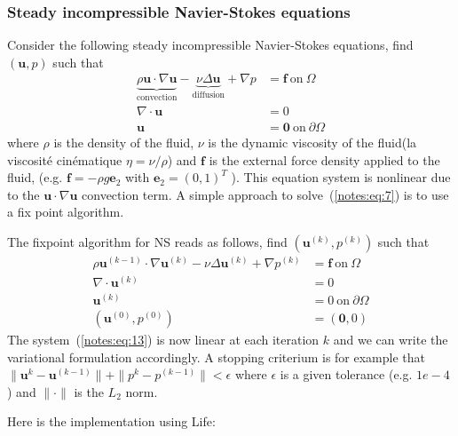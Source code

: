 \subsubsection{Steady incompressible Navier-Stokes equations}
  Consider the following steady incompressible Navier-Stokes
  equations, find $(\mathbf{u},p)$ such that
  \begin{equation}
    \label{notes:eq:7}
    \begin{split}
      \underbrace{\rho \mathbf{u} \cdot \nabla \mathbf{u}}_{\text{convection}} - \underbrace{\nu \Delta  \mathbf{u}}_{\text{diffusion}} + \nabla p &=  \mathbf{f} \ \text{on}\ \Omega \\
      \nabla \cdot \mathbf{u} &= 0 \\
      \mathbf{u} &= \mathbf{0}\ \text{on}\ \partial \Omega
    \end{split}
  \end{equation}
  where $\rho$ is the density of the fluid, $\nu$ is the dynamic
  viscosity of the fluid(la viscosité cinématique $\eta = \nu/\rho$) and $\mathbf{f}$ is the external force
  density applied to the fluid, (e.g. $\mathbf{f}=-\rho g \mathbf{e}_2$ with $\mathbf{e}_2=(0,1)^T$ ).  This equation system is nonlinear due
  to the $\mathbf{u} \cdot \nabla \mathbf{u}$ convection term. A
  simple approach to solve~(\ref{notes:eq:7}) is to use a fix point
  algorithm.


The fixpoint algorithm for NS reads as follows, find
$(\mathbf{u}^{(k)},p^{(k)})$ such that
    \begin{equation}
      \label{notes:eq:13}
    \begin{split}
      \rho\mathbf{u}^{(k-1)} \cdot \nabla \mathbf{u}^{(k)} - \nu \Delta  \mathbf{u}^{(k)} + \nabla p^{(k)} &= \mathbf{f} \ \text{on}\ \Omega \\
      \nabla \cdot \mathbf{u}^{(k)} &= 0 \\
      \mathbf{u}^{(k)} &= 0\ \text{on}\ \partial \Omega\\
      (\mathbf{u}^{(0)},p^{(0)}) &= (\mathbf{0},0)
    \end{split}
  \end{equation}
  The system~(\ref{notes:eq:13}) is now linear at each iteration $k$ and we
  can write the variational formulation accordingly. A stopping
  criterium is for example that
  $\|\mathbf{u}^{k}-\mathbf{u}^{(k-1)}\|+\|p^{k}-p^{(k-1)}\| <
  \epsilon$ where $\epsilon$ is a given tolerance (e.g. $1e-4$) and
  $\|\cdot\|$ is the $L_2$ norm.

  Here is the implementation using Life:

